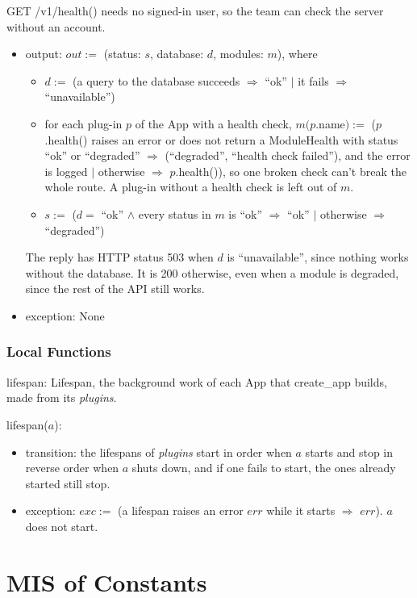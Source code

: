 \documentclass[12pt, titlepage]{article}
\begin{document}
\noindent GET /v1/health() needs no signed-in user, so the team can check the server
without an account.
\begin{itemize}
\item output: $out :=$ (status: $s$, database: $d$, modules: $m$), where
  \begin{itemize}
  \item $d :=$ (a query to the database succeeds $\Rightarrow$ ``ok'' $|$ it
    fails $\Rightarrow$ ``unavailable'')
  \item for each plug-in $p$ of the App with a health check, $m(p$.name$) :=$
    ($p$.health() raises an error or does not return a ModuleHealth
    with status ``ok'' or \mbox{``degraded''} $\Rightarrow$ (\mbox{``degraded''}, ``health check failed''), and the error
    is logged $|$ otherwise $\Rightarrow$ $p$.health()), so one broken check
    can't break the whole route. A plug-in without a health check is left out
    of $m$.
  \item $s :=$ ($d =$ ``ok'' $\land$ every status in $m$ is ``ok''
    $\Rightarrow$ ``ok'' $|$ otherwise $\Rightarrow$ ``degraded'')
  \end{itemize}
  The reply has HTTP status 503 when $d$ is ``unavailable'', since nothing
  works without the database. It is 200 otherwise, even when a module is
  degraded, since the rest of the API still works.
\item exception: None
\end{itemize}

\subsubsection{Local Functions}

\noindent lifespan: Lifespan, the background work of each App that create\_app
builds, made from its \textit{plugins}.

\medskip
\noindent lifespan($a$):
\begin{itemize}
\item transition: the lifespans of \textit{plugins} start in order when $a$
  starts and stop in reverse order when $a$ shuts down, and if one fails to
  start, the ones already started still stop.
\item exception: $exc :=$ (a lifespan raises an error $\mathit{err}$ while it
  starts $\Rightarrow$ $\mathit{err}$). $a$ does not start.
\end{itemize}

\newpage

\section{MIS of Constants} \label{MisConstants}
\end{document}
